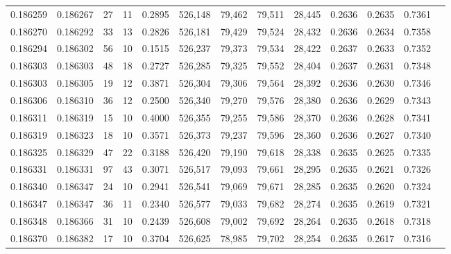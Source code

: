 \begin{tabular}{rrrrrrrrrrrrr}
0.186259 & 0.186267 &    27 &  11 &                                     0.2895 & 526,148 &  79,462 &  79,511 &  28,445 & 0.2636 & 0.2635 & 0.7361 \\
0.186270 & 0.186292 &    33 &  13 &                                     0.2826 & 526,181 &  79,429 &  79,524 &  28,432 & 0.2636 & 0.2634 & 0.7358 \\
0.186294 & 0.186302 &    56 &  10 &                                     0.1515 & 526,237 &  79,373 &  79,534 &  28,422 & 0.2637 & 0.2633 & 0.7352 \\
0.186303 & 0.186303 &    48 &  18 &                                     0.2727 & 526,285 &  79,325 &  79,552 &  28,404 & 0.2637 & 0.2631 & 0.7348 \\
0.186303 & 0.186305 &    19 &  12 &                                     0.3871 & 526,304 &  79,306 &  79,564 &  28,392 & 0.2636 & 0.2630 & 0.7346 \\
0.186306 & 0.186310 &    36 &  12 &                                     0.2500 & 526,340 &  79,270 &  79,576 &  28,380 & 0.2636 & 0.2629 & 0.7343 \\
0.186311 & 0.186319 &    15 &  10 &                                     0.4000 & 526,355 &  79,255 &  79,586 &  28,370 & 0.2636 & 0.2628 & 0.7341 \\
0.186319 & 0.186323 &    18 &  10 &                                     0.3571 & 526,373 &  79,237 &  79,596 &  28,360 & 0.2636 & 0.2627 & 0.7340 \\
0.186325 & 0.186329 &    47 &  22 &                                     0.3188 & 526,420 &  79,190 &  79,618 &  28,338 & 0.2635 & 0.2625 & 0.7335 \\
0.186331 & 0.186331 &    97 &  43 &                                     0.3071 & 526,517 &  79,093 &  79,661 &  28,295 & 0.2635 & 0.2621 & 0.7326 \\
0.186340 & 0.186347 &    24 &  10 &                                     0.2941 & 526,541 &  79,069 &  79,671 &  28,285 & 0.2635 & 0.2620 & 0.7324 \\
0.186347 & 0.186347 &    36 &  11 &                                     0.2340 & 526,577 &  79,033 &  79,682 &  28,274 & 0.2635 & 0.2619 & 0.7321 \\
0.186348 & 0.186366 &    31 &  10 &                                     0.2439 & 526,608 &  79,002 &  79,692 &  28,264 & 0.2635 & 0.2618 & 0.7318 \\
0.186370 & 0.186382 &    17 &  10 &                                     0.3704 & 526,625 &  78,985 &  79,702 &  28,254 & 0.2635 & 0.2617 & 0.7316 \\

\end{tabular}
